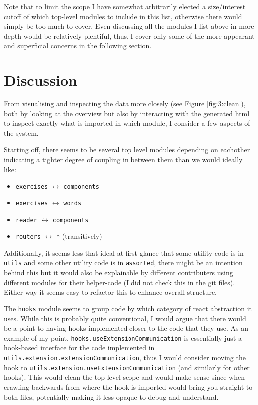 \documentclass{article}
\begin{document}
Note that to limit the scope I have somewhat arbitrarily elected a size/interest cutoff
of which top-level modules to include in this list,
otherwise there would simply be too much to cover.
Even discussing all the modules I list above in more depth would be relatively plentiful,
thus, I cover only some of the more appearant and superficial concerns in the following section.


\section{Discussion}
\label{discussion}

From visualising and inspecting the data more closely (see Figure \ref{fig:3:clean}), 
both by looking at the overview but also by interacting with 
\href{https://github.com/bjarkebrodin/recovery/blob/master/top_lvl_imports.html}{the generated html}
to inspect exactly what is imported in which module,
I consider a few aspects of the system.

\vspace*{1em}
\noindent
Starting off,
there seems to be several top level modules depending on eachother indicating a tighter degree of coupling
in between them than we would ideally like:
\begin{itemize}
  \item \verb|exercises| $\leftrightarrow$ \verb|components|
  \item \verb|exercises| $\leftrightarrow$ \verb|words|
  \item \verb|reader| $\leftrightarrow$ \verb|components|
  \item \verb|routers| $\leftrightarrow$ \verb|*| (transitively)
\end{itemize}

\vspace*{1em}
\noindent
Additionally,
it seems less that ideal at first glance that some utility code is in \verb|utils| and some other utility code is in \verb|assorted|,
there might be an intention behind this but it would also be explainable by different contributers using different modules for their
helper-code (I did not check this in the git files).
Either way it seems easy to refactor this to enhance overall structure.


\vspace*{1em}
\noindent
The \verb|hooks| module seems to group code by which category of react abstraction it uses.
While this is probably quite conventional,
I would argue that there would be a point to having hooks implemented closer to the code that they use.
As an example of my point,
\verb|hooks.useExtensionCommunication| is essentially just a hook-based interface for the code implemented in
\verb|utils.extension.extensionCommunication|,
thus I would consider moving the hook to \verb|utils.extension.useExtensionCommunication| (and similarly for other hooks).
This would clean the top-level scope and would make sense since when crawling backwards from where the hook is imported
would bring you straight to both files, potentially making it less opaque to debug and understand.
\end{document}
